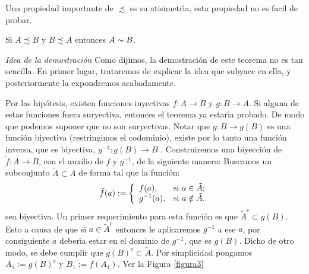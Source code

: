 Una propiedad importante de $\precsim$ es su atisimetr\'{\i}a,
esta propiedad no es facil de probar.

\begin{teorema}\label{scho-ber} Si
$A\precsim B$ y $B\precsim A$ entonces $A\thicksim B$.
\end{teorema}

\noindent\emph{Idea de la demostraci\'on} Como dijimos, la
demostraci\'on de este teorema  no es tan sencilla. En primer
lugar, trataremos de explicar la idea que subyace en ella,  y
posteriormente la expondremos acabadamente.

Por las hip\'otesis, existen funciones inyectivas
$f:A\longrightarrow B$ y $g:B\longrightarrow A$. Si alguna de
estas funciones fuera suryectiva, entonces el teorema ya
estar\'{\i}a probado. De modo que podemos suponer que no son
suryectivas. Notar que $g:B\longrightarrow g(B)$ es una funci\'on
biyectiva (restringimos el codominio), existe por lo tanto una
funci\'on inversa, que es biyectiva, $g^{-1}:g(B)\longrightarrow
B$ . Construiremos una biyecci\'on de $\tilde{f}:A\longrightarrow
B$, con el auxilio de $f$ y $g^{-1}$, de la siguiente manera:
Buscamos un subconjunto $\tilde{A}\subset A$ de forma tal que la
funci\'on:
\begin{equation}\label{ftilde}
\tilde{f}(a):=\left\{%
\begin{array}{ll}
    f(a), & \hbox{si $a\in \tilde{A}$;} \\
    g^{-1}(a), & \hbox{si $a\notin\tilde{A}$.} \\
\end{array}%
\right.
\end{equation}
sea biyectiva. Un primer requerimiento para esta funci\'on es que
$\tilde{A}^c\subset g(B)$. Esto a causa de que si
$a\in\tilde{A}^c$ entonces le aplicaremos $g^{-1}$ a ese $a$, por
consiguiente $a$ deber\'{\i}a estar en el dominio de $g^{-1}$, que
es $g(B)$. Dicho de otro modo, se debe cumplir que
$g(B)^c\subset\tilde{A}$. Por simplicidad pongamos $A_1:=g(B)^c$ y
$B_1:=f(A_1)$. Ver la Figura \vref{figura3}


